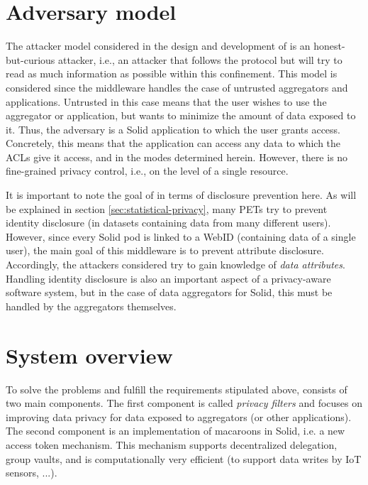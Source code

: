 \section{Adversary model}
\label{sec:attacker-model}
The attacker model considered in the design and development of \middleware{} is an honest-but-curious attacker, i.e., an attacker that follows the protocol but will try to read as much information as possible within this confinement. This model is considered since the middleware handles the case of untrusted aggregators and applications. Untrusted in this case means that the user wishes to use the aggregator or application, but wants to minimize the amount of data exposed to it. Thus, the adversary is a Solid application to which the user grants access. Concretely, this means that the application can access any data to which the \gls{ACL}s give it access, and in the modes determined herein. However, there is no fine-grained privacy control, i.e., on the level of a single resource. 

It is important to note the goal of \middleware{} in terms of disclosure prevention here. As will be explained in section \ref{sec:statistical-privacy}, many \gls{PETs} try to prevent identity disclosure (in datasets containing data from many different users). However, since every Solid pod is linked to a WebID (containing data of a single user), the main goal of this middleware is to prevent attribute disclosure. Accordingly, the attackers considered try to gain knowledge of \textit{data attributes}. Handling identity disclosure is also an important aspect of a privacy-aware software system, but in the case of data aggregators for Solid, this must be handled by the aggregators themselves.

\section{System overview}
To solve the problems and fulfill the requirements stipulated above, \middleware{} consists of two main components. The first component is called \textit{privacy filters} and focuses on improving data privacy for data exposed to aggregators (or other applications). The second component is an implementation of macaroons in Solid, i.e. a new access token mechanism. This mechanism supports decentralized delegation, group vaults, and is computationally very efficient (to support data writes by IoT sensors, ...).

